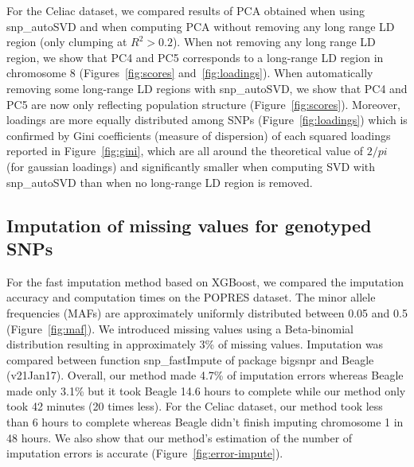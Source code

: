 \documentclass{bioinfo}
\begin{document}
For the Celiac dataset, we compared results of PCA obtained when using snp\_autoSVD and when computing PCA without removing any long range LD region (only clumping at $R^2 > 0.2$). When not removing any long range LD region, we show that PC4 and PC5 corresponds to a long-range LD region in chromosome 8 (Figures~\ref{fig:scores} and~\ref{fig:loadings}). When automatically removing some long-range LD regions with snp\_autoSVD, we show that PC4 and PC5 are now only reflecting population structure (Figure~\ref{fig:scores}). Moreover, loadings are more equally distributed among SNPs (Figure~\ref{fig:loadings}) which is confirmed by Gini coefficients (measure of dispersion) of each squared loadings reported in Figure~\ref{fig:gini}, which are all around the theoretical value of $2 / pi$ (for gaussian loadings) and significantly smaller when computing SVD with snp\_autoSVD than when no long-range LD region is removed.

\subsection{Imputation of missing values for genotyped SNPs}\label{sec:impute}

For the fast imputation method based on XGBoost, we compared  the imputation accuracy and computation times on the POPRES dataset. The minor allele frequencies (MAFs) are approximately uniformly distributed between 0.05 and 0.5 (Figure~\ref{fig:maf}). We introduced missing values using a Beta-binomial distribution resulting in approximately 3\% of missing values. Imputation was compared between function snp\_fastImpute of package bigsnpr and Beagle (v21Jan17). Overall, our method made 4.7\% of imputation errors whereas Beagle made only 3.1\% but it took Beagle 14.6 hours to complete while our method only took 42 minutes (20 times less). For the Celiac dataset, our method took less than 6 hours to complete whereas Beagle didn't finish imputing chromosome 1 in 48 hours. We also show that our method's estimation of the number of imputation errors is accurate (Figure~\ref{fig:error-impute}).
\end{document}
